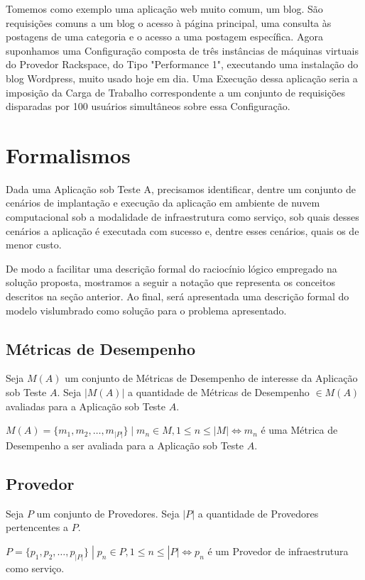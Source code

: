 Tomemos como exemplo uma aplicação web muito comum, um blog. São requisições 
comuns a um blog o acesso à página principal, uma consulta às postagens de uma
categoria e o acesso a uma postagem específica. Agora suponhamos uma Configuração
composta de três instâncias de máquinas virtuais do Provedor Rackspace, do Tipo 
"Performance 1", executando uma instalação do blog Wordpress, muito usado hoje em 
dia. Uma Execução dessa aplicação seria a imposição da Carga de Trabalho correspondente
a um conjunto de requisições disparadas por 100 usuários simultâneos sobre essa Configuração. 

\section{Formalismos}
Dada uma Aplicação sob Teste A, precisamos identificar, dentre um conjunto de 
cenários de implantação e execução da aplicação em ambiente de nuvem 
computacional sob a modalidade de infraestrutura como serviço, sob quais desses 
cenários a aplicação é executada com sucesso e, dentre esses cenários, quais os 
de menor custo.

De modo a facilitar uma descrição formal do raciocínio lógico empregado na
solução proposta, mostramos a seguir a notação que representa os conceitos 
descritos na seção anterior. Ao final, será apresentada uma descrição formal
do modelo vislumbrado como solução para o problema apresentado.

\subsection{Métricas de Desempenho}
Seja $M(A)$ um conjunto de Métricas de Desempenho de interesse da Aplicação sob 
Teste $A$. Seja $|M(A)|$ a quantidade de Métricas de Desempenho $\in M(A)$ avaliadas 
para a Aplicação sob Teste $A$.

$M(A) = \{m_1, m_2, \dotsc, m_{|P|}\}\; | \; m_n \in M, 1 \leq n \leq |M| \iff m_n $ 
é uma Métrica de Desempenho a ser avaliada para a Aplicação sob Teste $A$.

\subsection{Provedor}
Seja $P$ um conjunto de Provedores. Seja $|P|$ a quantidade de Provedores 
pertencentes a $P$.

$P = \{p_1, p_2, \dotsc, p_{|P|}\}\; | \; p_n \in P, 1 \leq n \leq |P| \iff p_n $ 
é um Provedor de infraestrutura como serviço.

